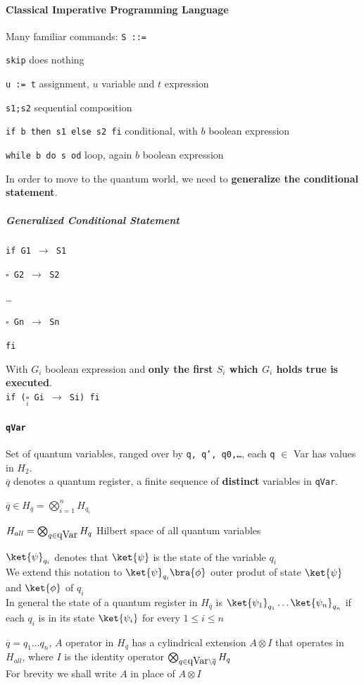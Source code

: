 \documentclass[10pt]{report}
\begin{document}
\paragraph{Classical Imperative Programming Language} Many familiar commands: \texttt{S ::=}
\begin{list}{}{}
	\item \texttt{skip} does nothing
	\item \texttt{u := t} assignment, $u$ variable and $t$ expression
	\item \texttt{s1;s2} sequential composition
	\item \texttt{if b then s1 else s2 fi} conditional, with $b$ boolean expression
	\item \texttt{while b do s od} loop, again $b$ boolean expression
\end{list}
In order to move to the quantum world, we need to \textbf{generalize the conditional statement}.
\subparagraph{Generalized Conditional Statement} \begin{list}{}{}
	\item \texttt{if G1 $\rightarrow$ S1}
	\item \texttt{$\square$ G2 $\rightarrow$ S2}
	\item \ldots
	\item \texttt{$\square$ Gn $\rightarrow$ Sn}
	\item \texttt{fi}
\end{list}
With $G_i$ boolean expression and \textbf{only the first $S_i$ which $G_i$ holds true is executed}.\\
\texttt{if ($\underset{i}{\square}$ Gi $\rightarrow$ Si) fi}
\paragraph{\texttt{qVar}} Set of quantum variables, ranged over by \texttt{q, q', q0,\ldots}, each \texttt{q} $\in$ Var has values in $H_2$.\\
$\overline{q}$ denotes a quantum register, a finite sequence of \textbf{distinct} variables in \texttt{qVar}.
\begin{list}{}{}
	\item $\overline{q}\in H_{\overline{q}} = \bigotimes_{i=1}^n H_{q_i}$
	\item $H_{all} = \bigotimes_{q\in\hbox{qVar}} H_q$ Hilbert space of all quantum variables
	\item $\ket{\psi}_{q_i}$ denotes that $\ket{\psi}$ is the state of the variable $q_i$\\
	We extend this notation to $\ket{\psi}_{q_i}\bra{\phi}$ outer produt of state $\ket{\psi}$ and $\ket{\phi}$ of $q_i$\\
	In general the state of a quantum register in $H_{\overline{q}}$ is $\ket{\psi_1}_{q_1}\ldots\ket{\psi_n}_{q_n}$ if each $q_i$ is in its state $\ket{\psi_i}$ for every $1\leq i\leq n$
	\item $\overline{q} = q_1\ldots q_n$, $A$ operator in $H_{\overline{q}}$ has a cylindrical extension $A\otimes I$ that operates in $H_{all}$, where $I$ is the identity operator $\bigotimes_{q\in\hbox{qVar}\setminus \overline{q}} H_q$\\
	For brevity we shall write $A$ in place of $A\otimes I$
\end{list}
\end{document}
